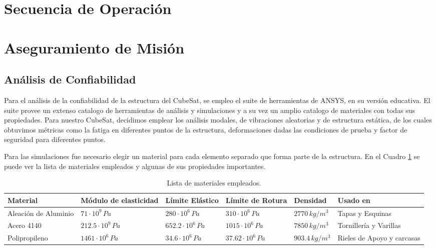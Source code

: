 \section{Secuencia de Operación}

\section{Aseguramiento de Misión}

  \subsection{Análisis de Confiabilidad}
    Para el análisis de la confiabilidad de la estructura del CubeSat, se empleo el suite de herramientas de ANSYS, en
    su versión educativa. El suite provee un extenso catalogo de herramientas de análisis y simulaciones y a su vez un
    amplio catalogo de materiales con todas sus propiedades. Para nuestro CubeSat, decidimos emplear los análisis
    modales, de vibraciones aleatorias y de estructura estática, de los cuales obtuvimos métricas como la fatiga en
    diferentes puntos de la estructura, deformaciones dadas las condiciones de prueba y factor de seguridad para
    diferentes puntos.

    Para las simulaciones fue necesario elegir un material para cada elemento separado que forma parte de la estructura.
    En el Cuadro \ref{tab:materiales_empleados} se puede ver la lista de materiales empleados y algunas de sus
    propiedades importantes.

    \begin{table}[H]
    \centering
    \small
    \begin{tabular}{|p{2.2cm}|p{2.3cm}|p{2.3cm}|p{2.5cm}|p{2cm}|p{2.5cm}|}
    \hline
    \textbf{Material} & \centering\textbf{Módulo de elasticidad} & \centering\textbf{Límite Elástico} & \centering\textbf{Límite de Rotura} & \centering\textbf{Densidad} & \centering\textbf{Usado en} \tabularnewline
    \hline
    Aleación de Aluminio & \centering $71 \cdot 10^9\,Pa$ & \centering $280 \cdot 10^6\,Pa$ & \centering $310 \cdot 10^6\,Pa$ & \centering $2770\,kg/m^3$ & Tapas y Esquinas \tabularnewline
    \hline
    Acero 4140 & \centering $212.5 \cdot 10^9\,Pa$ & \centering $652.2 \cdot 10^6\,Pa$ & \centering $1015 \cdot 10^6\,Pa$ & \centering $7850\,kg/m^3$ & Tornillería y Varillas \tabularnewline
    \hline
    Polipropileno & \centering $1461 \cdot 10^6\,Pa$ & \centering $34.6 \cdot 10^6\,Pa$ & \centering $37.62 \cdot 10^6\,Pa$ & \centering $903.4\,kg/m^3$ & Rieles de Apoyo y carcasas \tabularnewline
    \hline
    \end{tabular}
    \caption{Lista de materiales empleados.}
    \label{tab:materiales_empleados}
    \end{table}

